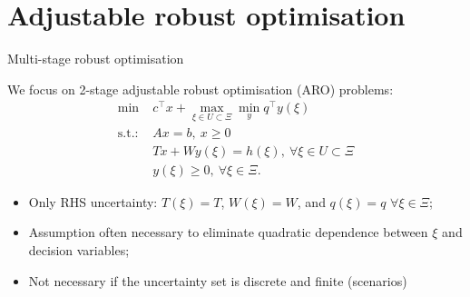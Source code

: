 \section{Adjustable robust optimisation}


\begin{frame}{Multi-stage robust optimisation}

	We focus on 2-stage adjustable robust optimisation (ARO) problems:
	\begin{equation} \tag{ARO}
	\begin{aligned}
		\min~  & c^\top x + \max_{\xi \in U \subset \Xi} \min_y q^\top y(\xi) \\
		\text{s.t.:~}  & Ax = b, \ x \ge 0 \\
			   & Tx + Wy(\xi) = h(\xi), \ \forall \xi \in U \subset \Xi \\
			   & y(\xi) \ge 0, \ \forall \xi \in \Xi.
	\end{aligned}
	\end{equation}
	\vspace{-6pt}
	\begin{itemize}
		\item Only \alert{RHS} uncertainty: $T(\xi) = T$, $W(\xi) = W$, and $q(\xi) = q$ $\forall \xi \in \Xi$;
		\item Assumption often necessary to eliminate \alert{quadratic} dependence between $\xi$ and decision variables;
		\item Not necessary if the uncertainty set is \alert{discrete} and \alert{finite} (scenarios)
	\end{itemize}



	
\end{frame}


